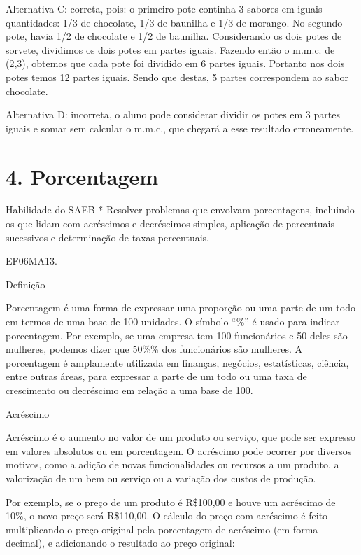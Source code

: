 Alternativa C: correta, pois: o primeiro pote continha 3 sabores em
iguais quantidades: 1/3 de chocolate, 1/3 de baunilha e 1/3 de morango.
No segundo pote, havia 1/2 de chocolate e 1/2 de baunilha. Considerando
os dois potes de sorvete, dividimos os dois potes em partes iguais.
Fazendo então o m.m.c. de (2,3), obtemos que cada pote foi dividido em 6
partes iguais. Portanto nos dois potes temos 12 partes iguais. Sendo que
destas, 5 partes correspondem ao sabor chocolate.

Alternativa D: incorreta, o aluno pode considerar dividir os potes em 3
partes iguais e somar sem calcular o m.m.c., que chegará a esse
resultado erroneamente.

\chapter{4. Porcentagem}

Habilidade do SAEB * Resolver problemas que envolvam porcentagens,
incluindo os que lidam com acréscimos e decréscimos simples, aplicação
de percentuais sucessivos e determinação de taxas percentuais.


\begin{itemize}
EF06MA13.
\end{itemize}

Definição

Porcentagem é uma forma de expressar uma proporção ou uma parte de um
todo em termos de uma base de 100 unidades. O símbolo ``\%'' é usado
para indicar porcentagem. Por exemplo, se uma empresa tem 100
funcionários e 50 deles são mulheres, podemos dizer que 50\%\% dos
funcionários são mulheres. A porcentagem é amplamente utilizada em
finanças, negócios, estatísticas, ciência, entre outras áreas, para
expressar a parte de um todo ou uma taxa de crescimento ou decréscimo em
relação a uma base de 100.

Acréscimo

Acréscimo é o aumento no valor de um produto ou serviço, que pode ser
expresso em valores absolutos ou em porcentagem. O acréscimo pode
ocorrer por diversos motivos, como a adição de novas funcionalidades ou
recursos a um produto, a valorização de um bem ou serviço ou a variação
dos custos de produção.

Por exemplo, se o preço de um produto é R\$100,00 e houve um acréscimo
de 10\%, o novo preço será R\$110,00. O cálculo do preço com acréscimo é
feito multiplicando o preço original pela porcentagem de acréscimo (em
forma decimal), e adicionando o resultado ao preço original:

